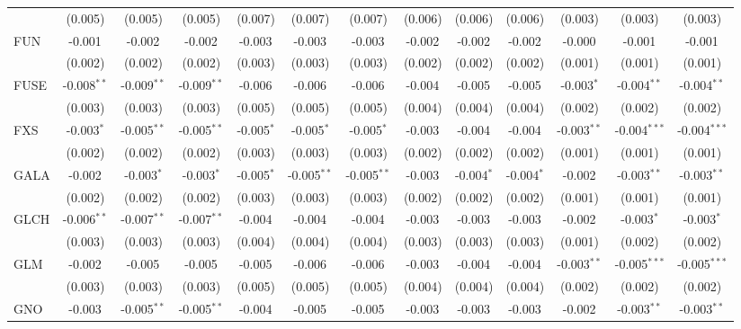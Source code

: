 \begin{table}[!htbp]
\begin{tabular}{@{\extracolsep{5pt}}lcccccccccccc}
  & (0.005) & (0.005) & (0.005) & (0.007) & (0.007) & (0.007) & (0.006) & (0.006) & (0.006) & (0.003) & (0.003) & (0.003) \\
 FUN & -0.001$^{}$ & -0.002$^{}$ & -0.002$^{}$ & -0.003$^{}$ & -0.003$^{}$ & -0.003$^{}$ & -0.002$^{}$ & -0.002$^{}$ & -0.002$^{}$ & -0.000$^{}$ & -0.001$^{}$ & -0.001$^{}$ \\
  & (0.002) & (0.002) & (0.002) & (0.003) & (0.003) & (0.003) & (0.002) & (0.002) & (0.002) & (0.001) & (0.001) & (0.001) \\
 FUSE & -0.008$^{**}$ & -0.009$^{**}$ & -0.009$^{**}$ & -0.006$^{}$ & -0.006$^{}$ & -0.006$^{}$ & -0.004$^{}$ & -0.005$^{}$ & -0.005$^{}$ & -0.003$^{*}$ & -0.004$^{**}$ & -0.004$^{**}$ \\
  & (0.003) & (0.003) & (0.003) & (0.005) & (0.005) & (0.005) & (0.004) & (0.004) & (0.004) & (0.002) & (0.002) & (0.002) \\
 FXS & -0.003$^{*}$ & -0.005$^{**}$ & -0.005$^{**}$ & -0.005$^{*}$ & -0.005$^{*}$ & -0.005$^{*}$ & -0.003$^{}$ & -0.004$^{}$ & -0.004$^{}$ & -0.003$^{**}$ & -0.004$^{***}$ & -0.004$^{***}$ \\
  & (0.002) & (0.002) & (0.002) & (0.003) & (0.003) & (0.003) & (0.002) & (0.002) & (0.002) & (0.001) & (0.001) & (0.001) \\
 GALA & -0.002$^{}$ & -0.003$^{*}$ & -0.003$^{*}$ & -0.005$^{*}$ & -0.005$^{**}$ & -0.005$^{**}$ & -0.003$^{}$ & -0.004$^{*}$ & -0.004$^{*}$ & -0.002$^{}$ & -0.003$^{**}$ & -0.003$^{**}$ \\
  & (0.002) & (0.002) & (0.002) & (0.003) & (0.003) & (0.003) & (0.002) & (0.002) & (0.002) & (0.001) & (0.001) & (0.001) \\
 GLCH & -0.006$^{**}$ & -0.007$^{**}$ & -0.007$^{**}$ & -0.004$^{}$ & -0.004$^{}$ & -0.004$^{}$ & -0.003$^{}$ & -0.003$^{}$ & -0.003$^{}$ & -0.002$^{}$ & -0.003$^{*}$ & -0.003$^{*}$ \\
  & (0.003) & (0.003) & (0.003) & (0.004) & (0.004) & (0.004) & (0.003) & (0.003) & (0.003) & (0.001) & (0.002) & (0.002) \\
 GLM & -0.002$^{}$ & -0.005$^{}$ & -0.005$^{}$ & -0.005$^{}$ & -0.006$^{}$ & -0.006$^{}$ & -0.003$^{}$ & -0.004$^{}$ & -0.004$^{}$ & -0.003$^{**}$ & -0.005$^{***}$ & -0.005$^{***}$ \\
  & (0.003) & (0.003) & (0.003) & (0.005) & (0.005) & (0.005) & (0.004) & (0.004) & (0.004) & (0.002) & (0.002) & (0.002) \\
 GNO & -0.003$^{}$ & -0.005$^{**}$ & -0.005$^{**}$ & -0.004$^{}$ & -0.005$^{}$ & -0.005$^{}$ & -0.003$^{}$ & -0.003$^{}$ & -0.003$^{}$ & -0.002$^{}$ & -0.003$^{**}$ & -0.003$^{**}$ \\

\end{tabular}
\end{table}
